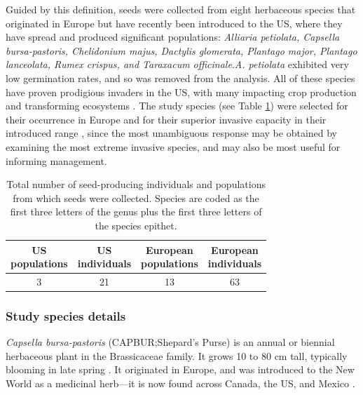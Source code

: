 \documentclass[12pt]{article}\usepackage[]{graphicx}\usepackage[]{color}
\begin{document}
	Guided by this definition, seeds were collected from eight herbaceous species that originated in Europe but have recently been introduced to the US, where they have spread and produced significant populations:\textit{ Alliaria petiolata, Capsella bursa-pastoris, Chelidonium majus, Dactylis glomerata, Plantago major, Plantago lanceolata, Rumex crispus, and Taraxacum officinale}.\textit{A. petiolata} exhibited very low germination rates, and so was removed from the analysis.  All of these species have proven prodigious invaders in the US, with many impacting crop production and transforming ecosystems \parencite[e.g.,][]{Froese2003,Wolfe2008}. The study species (see Table \ref{tab:seeds}) were selected for their occurrence in Europe and for their superior invasive capacity in their introduced range \parencite{Uva1997}, since the most unambiguous response may be obtained by examining the most extreme invasive species, and may also be most useful for informing management. 
	\begin{center}
		\begin{table}
			\centering
			\caption {Total number of seed-producing individuals and populations from which seeds were collected. Species are coded as the first three letters of the genus plus the first three letters of the species epithet.} \label{tab:seeds}  
			\begin{tabular}{|c|c|c|c|}
				\hline 
				\makecell{\textbf{US} \\ \textbf{populations}} & \makecell{\textbf{US} \\  \textbf{individuals}} & \makecell{\textbf{European} \\ \textbf{populations}} & \makecell{\textbf{European} \\ \textbf{individuals}} \\
				\hline
				3&	21&	13&	63\\
				\hline
			\end{tabular}
		\end{table}
	\end{center}
	\subsubsection{Study species details}
	\textit{Capsella bursa-pastoris} (CAPBUR;Shepard's Purse) is an annual or biennial herbaceous plant in the Brassicaceae family. It grows 10 to 80 cm tall, typically blooming in late spring \parencite{Defelice2001}. It originated in Europe, and was introduced to the New World as a medicinal herb---it is now found across Canada, the US, and Mexico \parencite{Westrich1989}.
	
\end{document}
